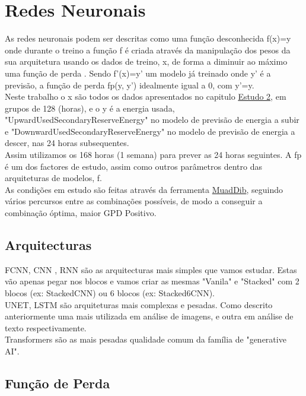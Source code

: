 \section{Redes Neuronais}

As redes neuronais podem ser descritas como uma função desconhecida f(x)=y onde durante o treino a função f é criada através da manipulação dos pesos da sua arquitetura usando os dados de treino, x, de forma a diminuir ao máximo uma função de perda . Sendo f'(x)=y' um modelo já treinado onde y' é a previsão, a função de perda fp(y, y') idealmente igual a 0, com y'=y.\\
Neste trabalho o x são todos os dados apresentados no capitulo \hyperref[ch:estudo_2]{Estudo 2}, em grupos de 128 (horas), e o y é a energia usada, "UpwardUsedSecondaryReserveEnergy" no modelo de previsão de energia a subir e "DownwardUsedSecondaryReserveEnergy" no modelo de previsão de energia a descer, nas 24 horas subsequentes. \\
Assim utilizamos os 168 horas (1 semana) para prever as 24 horas seguintes. A fp é um dos factores de estudo, assim como outros parâmetros dentro das arquiteturas de modelos, f. \\
As condições em estudo são feitas através da ferramenta \hyperref[se:muaddib]{MuadDib}, seguindo vários percursos entre as combinações possíveis, de modo a conseguir a combinação óptima, maior GPD Positivo.\\




\subsection{Arquitecturas}

FCNN, CNN , RNN são as arquitecturas mais simples que vamos estudar. Estas vão apenas pegar nos blocos e vamos criar as mesmas "Vanila" e "Stacked" com 2 blocos (ex: StackedCNN) ou 6 blocos (ex: Stacked6CNN).\\
UNET, LSTM são arquiteturas mais complexas e pesadas. Como descrito anteriormente uma mais utilizada em análise de imagens, e outra em análise de texto respectivamente.\\
Transformers são as mais pesadas qualidade comum da família de "generative AI".

\subsection{Função de Perda}

